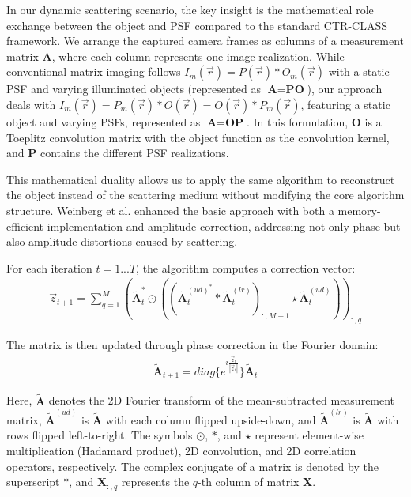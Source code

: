 \documentclass[12pt]{article}
\newenvironment{ourresponse}
    {\begin{tcolorbox}[width=\linewidth,breakable,enhanced,colback=gray!5,colframe=responsecolor!50,title=Response,left=5pt,right=5pt]}
    {\end{tcolorbox}}
\begin{document}
\begin{enumerate}[label=\arabic*.]
\begin{ourresponse}
        In our dynamic scattering scenario, the key insight is the mathematical role exchange between the object and PSF compared to the standard CTR-CLASS framework. We arrange the captured camera frames as columns of a measurement matrix $\textbf{A}$, where each column represents one image realization. While conventional matrix imaging follows $I_m(\vec{r}) = P(\vec{r}) \ast O_m(\vec{r})$ with a static PSF and varying illuminated objects (represented as $\textbf{A} = \textbf{P}\textbf{O}$), our approach deals with $I_m(\vec{r}) = P_m(\vec{r}) \ast O(\vec{r}) = O(\vec{r}) \ast P_m(\vec{r})$, featuring a static object and varying PSFs, represented as $\textbf{A} = \textbf{O}\textbf{P}$. In this formulation, $\textbf{O}$ is a Toeplitz convolution matrix with the object function as the convolution kernel, and $\textbf{P}$ contains the different PSF realizations.
        
        This mathematical duality allows us to apply the same algorithm to reconstruct the object instead of the scattering medium without modifying the core algorithm structure. Weinberg et al. \cite{weinberg2023noninvasive} enhanced the basic approach with both a memory-efficient implementation and amplitude correction, addressing not only phase but also amplitude distortions caused by scattering.
        
        For each iteration $t = 1...T$, the algorithm computes a correction vector:
        \begin{eqnarray}
            \vec{z}_{t+1}=\sum_{q=1}^{M}(\tilde{\textbf{A}}_t^* \odot ((\tilde{\textbf{A}}_t^{(ud)^*}*\tilde{\textbf{A}}_t^{(lr)})_{:,M-1} \star \tilde{\textbf{A}}_t^{(ud)}))_{:,q}
        \end{eqnarray}
        
        The matrix is then updated through phase correction in the Fourier domain:
        \begin{eqnarray}
            \tilde{\textbf{A}}_{t+1}=diag\{e^{i\frac{\vec{z}_t}{|\vec{z}_t|}}\}\tilde{\textbf{A}}_t
        \end{eqnarray}
        
        Here, $\tilde{\textbf{A}}$ denotes the 2D Fourier transform of the mean-subtracted measurement matrix, $\tilde{\textbf{A}}^{(ud)}$ is $\tilde{\textbf{A}}$ with each column flipped upside-down, and $\tilde{\textbf{A}}^{(lr)}$ is $\tilde{\textbf{A}}$ with rows flipped left-to-right. The symbols $\odot$, $*$, and $\star$ represent element-wise multiplication (Hadamard product), 2D convolution, and 2D correlation operators, respectively. The complex conjugate of a matrix is denoted by the superscript $*$, and $\textbf{X}_{:,q}$ represents the $q$-th column of matrix $\textbf{X}$.
        

\end{ourresponse}
\end{enumerate}
\end{document}
